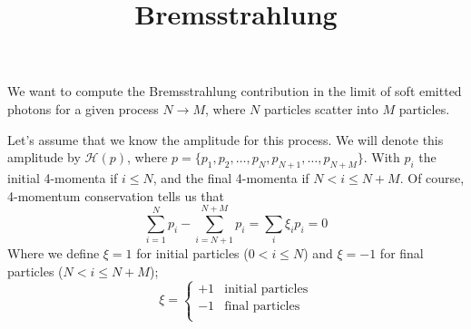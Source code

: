 \documentclass{article}
\title{Bremsstrahlung}
\author{}
\begin{document}
\maketitle

We want to compute the Bremsstrahlung contribution
in the limit of soft emitted photons for a given process $N \to M$,
where $N$ particles scatter into $M$ particles.

\begin{center}
\end{center}

Let's assume that we know the amplitude for this process.
We will denote this amplitude by $\mathcal{H}(p)$,
where $p = \{p_1, p_2, \ldots, p_N, p_{N+1}, \ldots, p_{N+M}\}$.
With $p_i$ the initial 4-momenta if $i\leq N$, and the final 4-momenta if $N<i\leq N+M$.
Of course, 4-momentum conservation tells us that
\begin{equation*}
	\sum_{i=1}^{N}p_i - \sum_{i=N+1}^{N+M} p_i
	= \sum_i \xi_i p_i
	= 0
\end{equation*}
Where we define $\xi=1$ for initial particles ($0<i\leq N$)
and $\xi=-1$ for final particles ($N<i\leq N+M$);
\begin{equation*}
    \xi
    = \begin{cases}
        +1 & \text{initial particles}\\
        -1 & \text{final particles}\\
    \end{cases}
\end{equation*}
\end{document}
